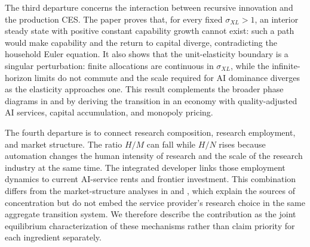 The third departure concerns the interaction between recursive innovation and the
production CES. The paper proves that, for every fixed $\sigma_{XL}>1$, an interior
steady state with positive constant capability growth cannot exist: such a path would
make capability and the return to capital diverge, contradicting the household Euler
equation. It also shows that the unit-elasticity boundary is
a singular perturbation: finite allocations are continuous in $\sigma_{XL}$, while
the infinite-horizon limits do not commute and the scale required for AI dominance
diverges as the elasticity approaches one. This result complements the broader phase
diagrams in \citet{nordhaus2021} and \citet{trammellkorinek2023} by deriving the
transition in an economy with quality-adjusted AI services, capital accumulation,
and monopoly pricing.

The fourth departure is to connect research composition, research employment, and
market structure. The ratio $H/M$ can fall while $H/N$ rises because automation
changes the human intensity of research and the scale of the research industry at
the same time. The integrated developer links those employment dynamics to current
AI-service rents and frontier investment. This combination differs from the
market-structure analyses in \citet{gans2024} and \citet{korinekvipra2025}, which explain
the sources of concentration but do not embed the service provider's research choice
in the same aggregate transition system. We therefore describe the contribution as
the joint equilibrium characterization of these mechanisms rather than claim
priority for each ingredient separately.
